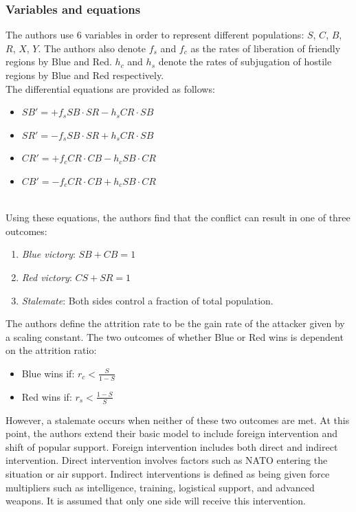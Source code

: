 \documentclass{article}
\begin{document}
\subsubsection{Variables and equations}
The authors use 6 variables in order to represent different populations: $S$, $C$, $B$, $R$, $X$, $Y$. The authors also denote $f_s$ and $f_c$ as the rates of liberation of friendly regions by Blue and Red. $h_c$ and $h_s$ denote the rates of subjugation of hostile regions by Blue and Red respectively.
\medskip
\\The differential equations are provided as follows:
\begin{itemize}
    \item $SB' = +f_sSB \cdot SR - h_sCR \cdot SB$
    \item $SR' = -f_sSB \cdot SR + h_sCR \cdot SB$
    \item $CR' = +f_cCR \cdot CB - h_cSB \cdot CR$
    \item $CB' = -f_cCR \cdot CB + h_cSB \cdot CR$
\end{itemize}
\medskip
\\Using these equations, the authors find that the conflict can result in one of three outcomes:
\begin{enumerate}
    \item \textit{Blue victory}: $SB + CB = 1$
    \item \textit{Red victory}: $CS + SR = 1$
    \item \textit{Stalemate}: Both sides control a fraction of total population.
\end{enumerate}
The authors define the attrition rate to be the gain rate of the attacker given by a scaling constant. The two outcomes of whether Blue or Red wins is dependent on the attrition ratio:
\begin{itemize}
    \item Blue wins if: $r_c < \frac{S}{1-S}$
    \item Red wins if: $r_s < \frac{1-S}{S}$
\end{itemize}
However, a stalemate occurs when neither of these two outcomes are met. At this point, the authors extend their basic model to include foreign intervention and shift of popular support. Foreign intervention includes both direct and indirect intervention. Direct intervention involves factors such as NATO entering the situation or air support. Indirect interventions is defined as being given force multipliers such as intelligence, training, logistical support, and advanced weapons. It is assumed that only one side will receive this intervention. 
\end{document}
